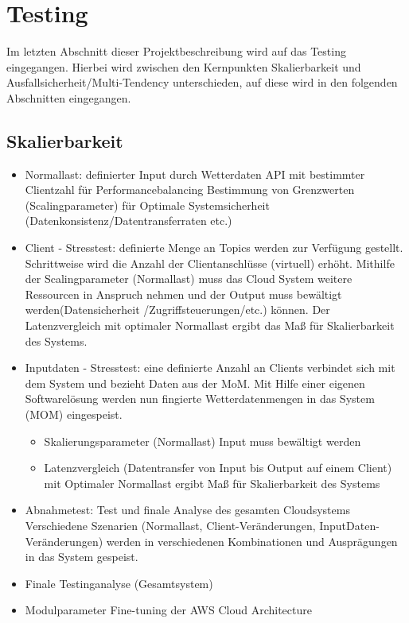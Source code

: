 \documentclass[paper,oneside,onecolumn,notitlepage,bibtotocnumbered,fontsize=12pt,bigheadings,ngerman]{scrartcl}
\begin{document}
\section{Testing}

Im letzten Abschnitt dieser Projektbeschreibung wird auf das Testing eingegangen. Hierbei wird zwischen den Kernpunkten Skalierbarkeit und Ausfallsicherheit/Multi-Tendency unterschieden, auf diese wird in den folgenden Abschnitten eingegangen.

\subsection{Skalierbarkeit}
\begin{itemize}
\item Normallast:	definierter Input durch Wetterdaten API mit bestimmter Clientzahl für Performancebalancing 
Bestimmung von Grenzwerten (Scalingparameter) für Optimale Systemsicherheit (Datenkonsistenz/Datentransferraten etc.)
\item Client - Stresstest:	definierte Menge an Topics werden  zur Verfügung gestellt. Schrittweise wird die Anzahl der Clientanschlüsse (virtuell) erhöht.  
Mithilfe der Scalingparameter (Normallast) muss das Cloud System weitere Ressourcen in Anspruch nehmen und der Output muss bewältigt werden(Datensicherheit\- /Zugriffsteuerungen/etc.) können. Der Latenzvergleich mit optimaler Normallast ergibt das Maß für Skalierbarkeit des Systems.
\item Inputdaten - Stresstest:	eine definierte Anzahl an Clients verbindet sich mit dem System und bezieht Daten aus der MoM. Mit Hilfe einer eigenen Softwarelösung werden nun fingierte Wetterdatenmengen in das System (MOM) eingespeist.
\begin{itemize}
\item Skalierungsparameter (Normallast) Input muss bewältigt werden
\item Latenzvergleich  (Datentransfer von Input bis Output auf einem Client) mit Optimaler Normallast ergibt Maß für Skalierbarkeit des Systems
\end{itemize}
\item Abnahmetest: Test und finale Analyse des gesamten Cloudsystems 
Verschiedene Szenarien  (Normallast, Client-Veränderungen, InputDaten-Veränderungen) werden in verschiedenen Kombinationen und Ausprägungen in das System gespeist.
\item Finale Testinganalyse (Gesamtsystem)
\item Modulparameter Fine-tuning der AWS Cloud Architecture
\clearpage
\end{itemize}
\end{document}
